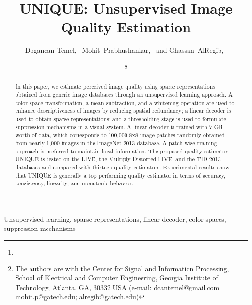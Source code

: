 \documentclass[draftcls,12pt, onecolumn]{IEEEtran}
\begin{document}
\title{UNIQUE: Unsupervised Image Quality Estimation}




\author{Dogancan Temel,~
        	  Mohit~Prabhushankar,~ and Ghassan~AlRegib,~


\thanks{}

\thanks{The authors are with the Center for Signal and Information Processing, School
of Electrical and Computer Engineering, Georgia Institute of Technology, Atlanta,
GA, 30332 USA (e-mail: dcantemel@gmail.com; mohit.p@gatech.edu; alregib@gatech.edu) }}











\maketitle

\begin{abstract}
In this paper, we estimate perceived image quality using sparse representations obtained from generic image databases through an unsupervised learning approach. A color space transformation, a mean subtraction, and a whitening operation are used to enhance descriptiveness of images by reducing spatial redundancy; a linear decoder is used to obtain sparse representations; and a thresholding stage is used to formulate suppression mechanisms in a visual system. A linear decoder is trained with 7 GB worth of data, which corresponds to 100,000 8x8 image patches randomly obtained from nearly 1,000 images in the ImageNet 2013 database. A patch-wise training approach is preferred to maintain local information. The proposed quality estimator UNIQUE is tested on the LIVE, the Multiply Distorted LIVE, and the TID 2013 databases and compared with thirteen quality estimators. Experimental results show that UNIQUE is generally a top performing quality estimator in terms of accuracy, consistency, linearity, and monotonic behavior.
\end{abstract}

\begin{IEEEkeywords}
Unsupervised learning, sparse representations, linear decoder, color spaces, suppression mechanisms 
\end{IEEEkeywords}
\end{document}
